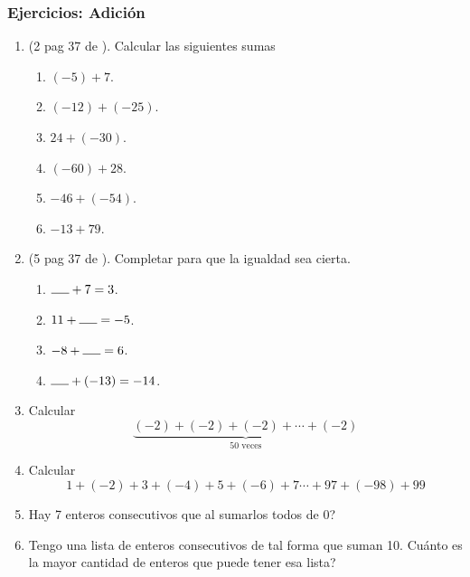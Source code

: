 \begin{center}
	\vspace{-1cm}
	\subsubsection{Ejercicios: Adición}\label{ejercicios_subsubsection_adicion_numeros_reales}
\end{center}
\begin{enumerate}
		\item (2 pag 37 de \cite{Dimensions_Math_7A}). Calcular las siguientes sumas
				\begin{multicols}{3}
						\begin{enumerate}[label=\Alph*)]
								\item $(-5)+7$.
								\item $(-12)+(-25)$.
								\item $24+(-30)$.
								\item $(-60)+28$.
								\item $-46+(-54)$.
								\item $-13+79$.
						\end{enumerate}	
				\end{multicols}
		
		\item (5 pag 37 de \cite{Dimensions_Math_7A}). Completar para que la igualdad sea cierta.
		\begin{multicols}{3}
			\begin{enumerate}[label=\Alph*)]
				\item $\rule{5mm}{0.15mm}+ 7 = 3$.
				\item $ 11 + \rule{5mm}{0.15mm} = -5$.
				\item $ -8 + \rule{5mm}{0.15mm} = 6$.
				\item $ \rule{5mm}{0.15mm} + (-13)= -14$.
			\end{enumerate}	
		\end{multicols}
		
		\item Calcular
				\[
						\underbrace{(-2)+(-2)+(-2)+\cdots+(-2)}_{50 \text{ veces}}
				\] 
				
		\item Calcular
				\[
						1+(-2)+3+(-4)+5+(-6)+7\cdots + 97+(-98)+99
				\]
				
		\item Hay 7 enteros consecutivos que al sumarlos todos de 0?
		
		\item Tengo una lista de enteros consecutivos de tal forma que suman 10. Cuánto es la mayor cantidad de enteros que puede tener esa lista?
\end{enumerate}
\newpage

